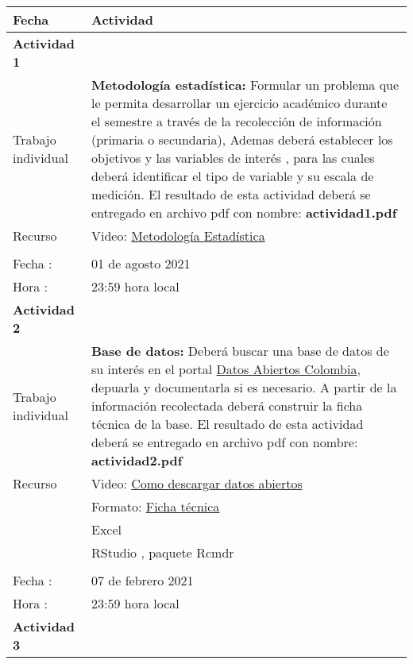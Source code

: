 \documentclass[base=hide,11pt]{elegantbook}
\begin{document}
\begin{tabular}{p{4cm}p{10cm}}
\hline	
Fecha                   & Actividad	\\
\hline 	
{\bf Actividad 1}            &\\
Trabajo individual     & \textcolor{col3}{\bf Metodología estadística:} Formular un  problema que le permita  desarrollar un  ejercicio académico durante  el  semestre a través de  la recolección  de información (primaria o secundaria), Ademas deberá establecer los  objetivos y las  variables de  interés , para las  cuales  deberá  identificar el tipo de  variable  y su  escala  de medición.  El resultado  de esta actividad deberá se entregado  en archivo pdf con  nombre: {\bf actividad1.pdf}  \\
Recurso & Video: \href{URL}{Metodología Estadística}\\
&\\
Fecha  : & 01 de agosto 2021\\
Hora   : & 23:59 hora local \\
\hline 
{\bf Actividad 2}  & \\
Trabajo individual &  \textcolor{col3}{\bf Base de datos:} Deberá  buscar una  base de  datos  de su interés  en el  portal  \href{https://www.datos.gov.co/}{Datos Abiertos Colombia},  depuarla  y  documentarla  si es  necesario. A partir de la información  recolectada deberá construir la ficha técnica de  la base. El resultado  de esta actividad deberá se entregado  en archivo pdf con  nombre: {\bf actividad2.pdf} \\
Recurso & Video: \href{https://www.youtube.com/watch?v=lRftK2mL3Sw}{Como descargar datos abiertos}\\
&Formato:  \href{https://drive.google.com/file/d/1O1eaS8y6olf5o_42ehgDgVZ4q1dganbd/view?usp=sharing}{Ficha técnica}\\
& Excel \\
& RStudio , paquete Rcmdr \\
&\\
Fecha  : & 07 de febrero  2021\\
Hora   : & 23:59 hora local \\
\hline 
{\bf Actividad 3}  &\\ 

\end{tabular}
\end{document}
